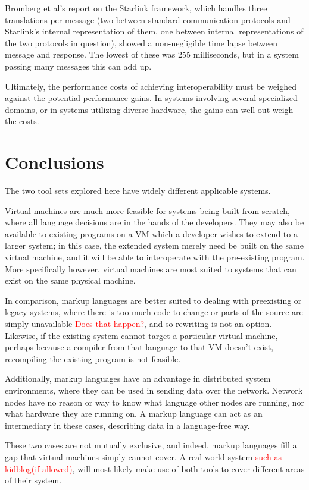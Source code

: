 \documentclass{sig-alternate}
\newcommand{\mycomment}[1]{\textcolor{red}{#1}}
\begin{document}
Bromberg et al's report on the Starlink framework, which handles three translations per message (two between standard communication protocols and Starlink's internal representation of them, one between internal representations of the two protocols in question), showed a non-negligible time lapse between message and response. The lowest of these was 255 milliseconds, but in a system passing many messages this can add up.

Ultimately, the performance costs of achieving interoperability must be weighed against the potential performance gains. In systems involving several specialized domains, or in systems utilizing diverse hardware, the gains can well out-weigh the costs.



\section{Conclusions}

The two tool sets explored here have widely different applicable systems. 

Virtual machines are much more feasible for systems being built from scratch, where all language decisions are in the hands of the developers. They may also be available to existing programs on a VM which a developer wishes to extend to a larger system; in this case, the extended system merely need be built on the same virtual machine, and it will be able to interoperate with the pre-existing program. More specifically however, virtual machines are most suited to systems that can exist on the same physical machine.

In comparison, markup languages are better suited to dealing with preexisting or legacy systems, where there is too much code to change or parts of the source are simply unavailable \mycomment{Does that happen?},
and so rewriting is not an option. Likewise, if the existing system cannot target a particular virtual machine, perhaps because a compiler from that language to that VM doesn't exist, recompiling the existing program is not feasible.

Additionally, markup languages have an advantage in distributed system environments, where they can be used in sending data over the network. Network nodes have no reason or way to know what language other nodes are running, nor what hardware they are running on. A markup language can act as an intermediary in these cases, describing data in a language-free way.

These two cases are not mutually exclusive, and indeed, markup languages fill a gap that virtual machines simply cannot cover. A real-world system \mycomment{such as kidblog(if allowed)}, will most likely make use of both tools to cover different areas of their system.
\end{document}
